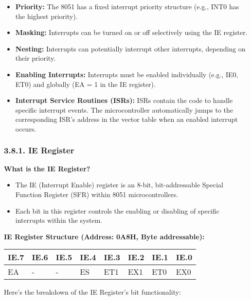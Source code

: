 \documentclass[
]{article}
\begin{document}
\begin{itemize}
\item
  \textbf{Priority:} The 8051 has a fixed interrupt priority structure
  (e.g., INT0 has the highest priority).
\item
  \textbf{Masking:} Interrupts can be turned on or off selectively using
  the IE register.
\item
  \textbf{Nesting:} Interrupts can potentially interrupt other
  interrupts, depending on their priority.
\item
  \textbf{Enabling Interrupts:} Interrupts must be enabled individually
  (e.g., IE0, ET0) and globally (EA = 1 in the IE register).
\end{itemize}

\begin{itemize}
\item
  \textbf{Interrupt Service Routines (ISRs):} ISRs contain the code to
  handle specific interrupt events. The microcontroller automatically
  jumps to the corresponding ISR's address in the vector table when an
  enabled interrupt occurs.
\end{itemize}

\hypertarget{381-ie-register}{%
\subsubsection{3.8.1. IE Register}\label{381-ie-register}}

\textbf{What is the IE Register?}

\begin{itemize}
\item
  The IE (Interrupt Enable) register is an 8-bit, bit-addressable
  Special Function Register (SFR) within 8051 microcontrollers.
\item
  Each bit in this register controls the enabling or disabling of
  specific interrupts within the system.
\end{itemize}

\textbf{IE Register Structure (Address: 0A8H, Byte addressable):}

\begin{longtable}[]{@{}llllllll@{}}
\toprule
IE.7 & IE.6 & IE.5 & IE.4 & IE.3 & IE.2 & IE.1 & IE.0 \\
\midrule
\endhead
EA & - & - & ES & ET1 & EX1 & ET0 & EX0 \\
\bottomrule
\end{longtable}

Here's the breakdown of the IE Register's bit functionality:
\end{document}

